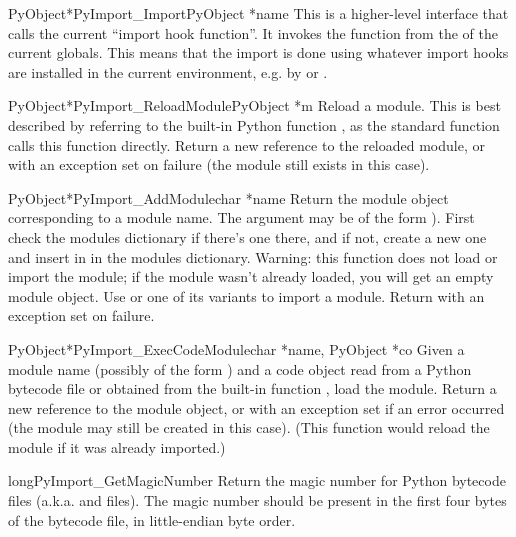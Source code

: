 \documentclass{manual}
\begin{document}
\begin{cfuncdesc}{PyObject*}{PyImport_Import}{PyObject *name}
This is a higher-level interface that calls the current ``import hook
function''.  It invokes the  function from the
 of the current globals.  This means that the
import is done using whatever import hooks are installed in the
current environment, e.g. by  or
.
\end{cfuncdesc}

\begin{cfuncdesc}{PyObject*}{PyImport_ReloadModule}{PyObject *m}
Reload a module.  This is best described by referring to the built-in
Python function , as the standard
 function calls this function directly.  Return a
new reference to the reloaded module, or \NULL{} with an exception set
on failure (the module still exists in this case).
\end{cfuncdesc}

\begin{cfuncdesc}{PyObject*}{PyImport_AddModule}{char *name}
Return the module object corresponding to a module name.  The
 argument may be of the form ).  First
check the modules dictionary if there's one there, and if not, create
a new one and insert in in the modules dictionary.
Warning: this function does not load or import the module; if the
module wasn't already loaded, you will get an empty module object.
Use  or one of its variants to
import a module.
Return \NULL{} with an exception set on failure.
\end{cfuncdesc}

\begin{cfuncdesc}{PyObject*}{PyImport_ExecCodeModule}{char *name, PyObject *co}
Given a module name (possibly of the form ) and a
code object read from a Python bytecode file or obtained from the
built-in function , load the
module.  Return a new reference to the module object, or \NULL{} with
an exception set if an error occurred (the module may still be created
in this case).  (This function would reload the module if it was
already imported.)
\end{cfuncdesc}

\begin{cfuncdesc}{long}{PyImport_GetMagicNumber}{}
Return the magic number for Python bytecode files (a.k.a.
 and  files).  The magic number should be
present in the first four bytes of the bytecode file, in little-endian
byte order.
\end{cfuncdesc}
\end{document}
